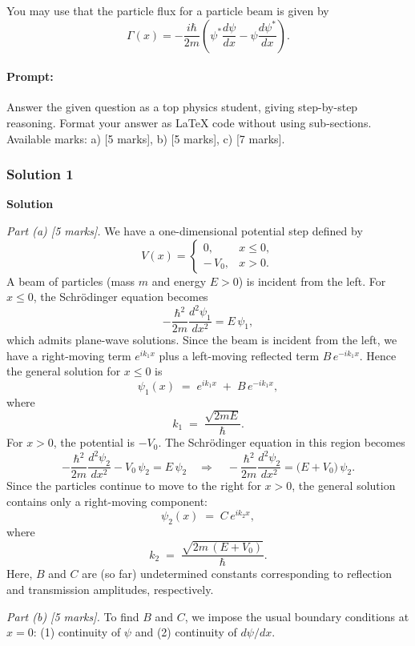 \documentclass{article}
\begin{document}
You may use that the particle flux for a particle beam is given by
\[
\Gamma(x) = -\frac{i\hbar}{2m} \left( \psi^* \frac{d\psi}{dx} - \psi \frac{d\psi^*}{dx} \right).
\]


\paragraph{Prompt: \\} 
Answer the given question as a top physics student, giving step-by-step reasoning. Format your answer as LaTeX code without using sub-sections. Available marks: a) [5 marks], b) [5 marks], c) [7 marks].


\subsubsection{Solution 1}
\noindent\textbf{Solution}

\bigskip

\noindent
\textit{Part (a) [5 marks].} 
We have a one-dimensional potential step defined by
\[
V(x) = \begin{cases}
0, & x \le 0,\\
-\,V_0, & x > 0.
\end{cases}
\]
A beam of particles (mass $m$ and energy $E>0$) is incident from the left. For $x \le 0$, the Schr\"odinger equation becomes
\[
-\frac{\hbar^2}{2m}\frac{d^2\psi_1}{dx^2} = E\,\psi_1,
\]
which admits plane-wave solutions. Since the beam is incident from the left, we have a right-moving term $e^{ik_1 x}$ plus a left-moving reflected term $B\,e^{-ik_1 x}$. Hence the general solution for $x \le 0$ is
\[
\psi_1(x) \;=\; e^{i k_1 x} \;+\; B\,e^{-i k_1 x},
\]
where 
\[
k_1 \;=\; \frac{\sqrt{2m E}}{\hbar}.
\]
For $x > 0$, the potential is $-V_0$. The Schr\"odinger equation in this region becomes
\[
-\frac{\hbar^2}{2m}\frac{d^2\psi_2}{dx^2} - V_0\,\psi_2 = E\,\psi_2
\quad\Longrightarrow\quad
-\frac{\hbar^2}{2m}\frac{d^2\psi_2}{dx^2} = \bigl(E + V_0\bigr)\,\psi_2.
\]
Since the particles continue to move to the right for $x>0$, the general solution contains only a right-moving component:
\[
\psi_2(x) \;=\; C\,e^{i k_2 x}, 
\]
where 
\[
k_2 \;=\; \frac{\sqrt{2m\,(E + V_0)}}{\hbar}.
\]
Here, $B$ and $C$ are (so far) undetermined constants corresponding to reflection and transmission amplitudes, respectively.

\bigskip

\noindent
\textit{Part (b) [5 marks].}
To find $B$ and $C$, we impose the usual boundary conditions at $x=0$: (1) continuity of $\psi$ and (2) continuity of $d\psi/dx$.
\end{document}

